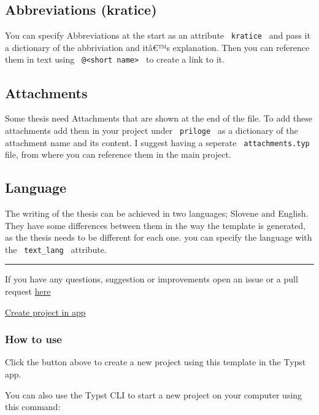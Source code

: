 \subsection{Abbreviations (kratice)}\label{abbreviations-kratice}

You can specify Abbreviations at the start as an attribute
\texttt{\ kratice\ } and pass it a dictionary of the abbriviation and
itâ€™s explanation. Then you can reference them in text using
\texttt{\ @\textless{}short\ name\textgreater{}\ } to create a link to
it.

\subsection{Attachments}\label{attachments}

Some thesis need Attachments that are shown at the end of the file. To
add these attachments add them in your project under
\texttt{\ priloge\ } as a dictionary of the attachment name and its
content. I suggest having a seperate \texttt{\ attachments.typ\ } file,
from where you can reference them in the main project.

\subsection{Language}\label{language}

The writing of the thesis can be achieved in two languages; Slovene and
English. They have some differences between them in the way the template
is generated, as the thesis needs to be different for each one. you can
specify the language with the \texttt{\ text\_lang\ } attribute.

\begin{center}\rule{0.5\linewidth}{0.5pt}\end{center}

If you have any questions, suggestion or improvements open an issue or a
pull request
\href{https://github.com/Tiggax/famnit_typst_template}{here}

\href{/app?template=sunny-famnit&version=0.2.0}{Create project in app}

\subsubsection{How to use}\label{how-to-use}

Click the button above to create a new project using this template in
the Typst app.

You can also use the Typst CLI to start a new project on your computer
using this command:

